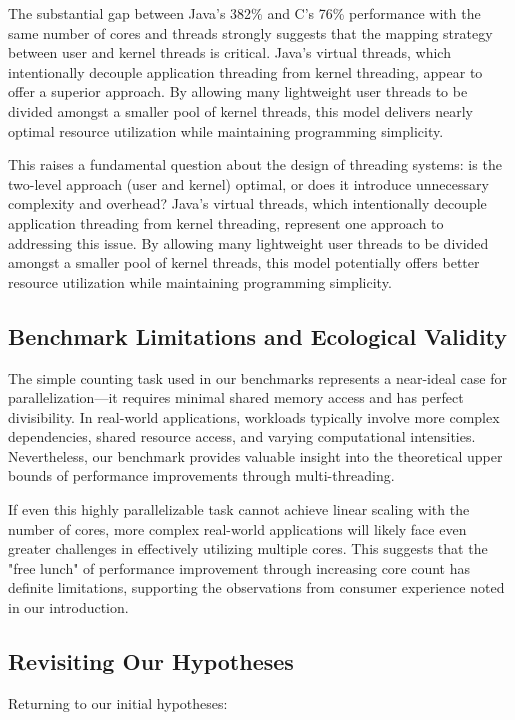 \documentclass[12pt,a4paper]{article}
\begin{document}
The substantial gap between Java's 382\% and C's 76\% performance with the same number of cores and threads strongly suggests that the mapping strategy between user and kernel threads is critical. Java's virtual threads, which intentionally decouple application threading from kernel threading, appear to offer a superior approach. By allowing many lightweight user threads to be divided amongst a smaller pool of kernel threads, this model delivers nearly optimal resource utilization while maintaining programming simplicity.

This raises a fundamental question about the design of threading systems: is the two-level approach (user and kernel) optimal, or does it introduce unnecessary complexity and overhead? Java's virtual threads, which intentionally decouple application threading from kernel threading, represent one approach to addressing this issue. By allowing many lightweight user threads to be divided amongst a smaller pool of kernel threads, this model potentially offers better resource utilization while maintaining programming simplicity.

\subsection{Benchmark Limitations and Ecological Validity}

The simple counting task used in our benchmarks represents a near-ideal case for parallelization—it requires minimal shared memory access and has perfect divisibility. In real-world applications, workloads typically involve more complex dependencies, shared resource access, and varying computational intensities. Nevertheless, our benchmark provides valuable insight into the theoretical upper bounds of performance improvements through multi-threading.

If even this highly parallelizable task cannot achieve linear scaling with the number of cores, more complex real-world applications will likely face even greater challenges in effectively utilizing multiple cores. This suggests that the "free lunch" of performance improvement through increasing core count has definite limitations, supporting the observations from consumer experience noted in our introduction.

\subsection{Revisiting Our Hypotheses}

Returning to our initial hypotheses:
\end{document}
